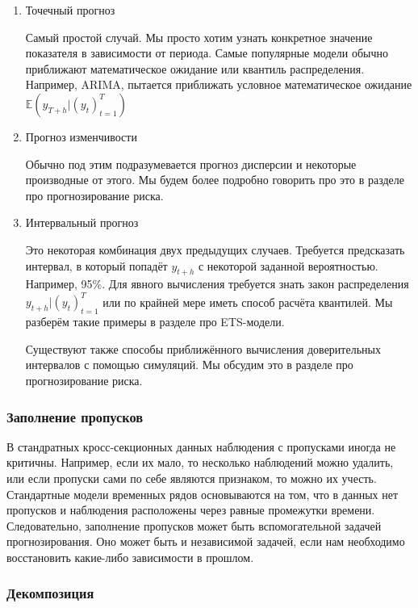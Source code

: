 \documentclass[12pt,fleqn]{article}
\begin{document}
\begin{enumerate}
	\item Точечный прогноз
	
	Самый простой случай. Мы просто хотим узнать конкретное значение показателя в зависимости от периода. Самые популярные модели обычно приближают математическое ожидание или квантиль распределения. Например, ARIMA, пытается приближать условное математическое ожидание $\mathbb{E}(y_{T+h} | (y_t)_{t=1}^{T})$	
	
	
	\item Прогноз изменчивости
	
	Обычно под этим подразумевается прогноз дисперсии и некоторые производные от этого. Мы будем более подробно говорить про это в разделе про прогнозирование риска.
	
	\item Интервальный прогноз
	
	Это некоторая комбинация двух предыдущих случаев. Требуется предсказать интервал, в который попадёт $y_{t+h}$ с некоторой заданной вероятностью. Например, 95\%. Для явного вычисления требуется знать закон распределения $y_{t+h}  | (y_t)_{t=1}^{T}$ или по крайней мере иметь способ расчёта квантилей. Мы разберём такие примеры в разделе про ETS-модели. 
	
	Существуют также способы приближённого вычисления доверительных интервалов с помощью симуляций. Мы обсудим это в разделе про прогнозирование риска.
	
\end{enumerate}

\subsubsection{Заполнение пропусков}

В стандратных кросс-секционных данных наблюдения с пропусками иногда не критичны. Например, если их мало, то несколько наблюдений можно удалить, или если пропуски сами по себе являются признаком, то можно их учесть. Стандартные модели временных рядов основываются на том, что в данных нет пропусков и наблюдения расположены через равные промежутки времени. Следовательно, заполнение пропусков может быть вспомогательной задачей прогнозирования. Оно может быть и независимой задачей, если нам необходимо восстановить какие-либо зависимости в прошлом.

\subsubsection{Декомпозиция}
\end{document}
